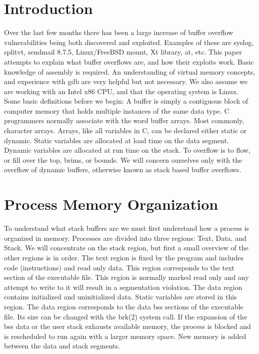 \documentclass[12pt]{article}
\begin{document}
\section{Introduction}
Over the last few months there has been a large increase of buffer overflow vulnerabilities being both discovered and exploited. Examples of these are syslog, splitvt, sendmail 8.7.5, Linux/FreeBSD mount, Xt library, at, etc. This paper attempts to explain what buffer overflows are, and how their exploits work. Basic  knowledge of assembly is required. An understanding of virtual memory concepts, and experience with gdb are  very helpful but not necessary. We also assume we are working with an Intel x86 CPU, and that the operating  system is Linux. Some basic definitions before we begin: A buffer is simply a contiguous block of computer  memory that holds multiple instances of  the same data type. C programmers normally associate with the word  buffer arrays. Most commonly, character arrays. Arrays, like all variables in C,  can be declared either static or  dynamic. Static variables are allocated at load time on the data segment. Dynamic variables are allocated at  run  time on the stack. To overflow is to flow, or fill over the top, brims, or bounds.
We will concern ourselves only  with the overflow of dynamic buffers,
otherwise known as stack based buffer overflows.

\section{Process Memory Organization}

To understand what stack buffers are we must first understand how a process is organized in memory. Processes 
are divided into three regions: Text, Data, and Stack. We will concentrate on the stack region, but first a small 
overview of the other regions is in order. The text region is fixed by the program and includes code 
(instructions) and read only data. This region corresponds to the text section of the executable file. This region is normally marked read only and any attempt to write to it will result in a segmentation violation. The data 
region contains initialized and uninitialized data. Static variables are stored in this region. The data region 
corresponds to the data bss sections of the executable file. Its size can be changed with the brk(2) system call. If 
the expansion of the bss data or the user stack exhausts available memory, the process is blocked and is 
rescheduled to run again with a larger memory space. New memory is added between the data and stack 
segments.
\end{document}
